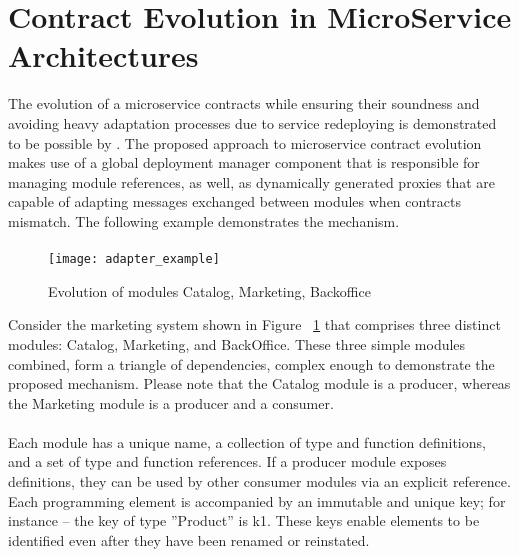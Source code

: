 \section{Contract Evolution in MicroService Architectures} %
\label{sec:contract_evolution_in_microservice_architectures}

The evolution of a microservice contracts while ensuring their soundness and
avoiding heavy adaptation processes due to service redeploying is demonstrated to be possible by \citeauthor{seco2020robust} \cite{seco2020robust}.
The proposed approach to microservice contract evolution \cite{seco2020robust} makes use of a global deployment manager component that is responsible for managing module references,
as well, as dynamically generated proxies that are capable of adapting messages exchanged between modules when contracts mismatch.
The following example demonstrates the mechanism.

\paragraph{}

\begin{figure}[htbp]
    \centering
    \texttt{[image: adapter\_example]}
    \caption{Evolution of modules Catalog, Marketing, Backoffice \cite{seco2020robust}}
    \label{fig:evolution_of_modules}
\end{figure}

Consider the marketing system shown in Figure ~\ref{fig:evolution_of_modules} that comprises three distinct modules: Catalog, Marketing, and BackOffice.
These three simple modules combined, form a triangle of dependencies, complex enough to demonstrate the proposed mechanism.
Please note that the Catalog module is a producer, whereas the Marketing module is a producer and a consumer.

\paragraph{}

Each module has a unique name, a collection of type and function definitions, and a set of type and function references.
If a producer module exposes definitions, they can be used by other consumer modules via an explicit reference.
Each programming element is accompanied by an immutable and unique key; for instance – the key of type ''Product'' is k1.
These keys enable elements to be identified even after they have been renamed or reinstated.

